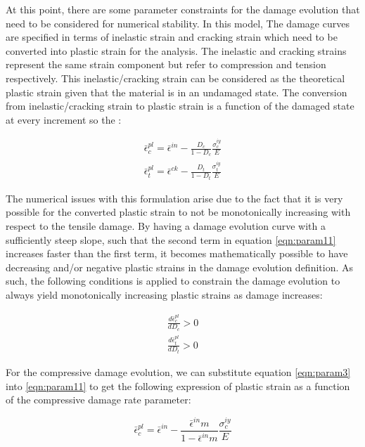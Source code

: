At this point, there are some parameter constraints for the damage evolution that need to be considered for numerical stability. In this model, The damage curves are specified in terms of inelastic strain and cracking strain which need to be converted into plastic strain for the analysis. The inelastic and cracking strains represent the same strain component but refer to compression and tension respectively. This inelastic/cracking strain can be considered as the theoretical plastic strain given that the material is in an undamaged state. The conversion from inelastic/cracking strain to plastic strain is a function of the damaged state at every increment so the :

\begin{equation}
\label{eqn:param11}
\begin{array}{c}
\bar{\epsilon}_{c}^{pl}=\bar{\epsilon}^{in}-\frac{D_{c}}{1-D_{c}}\frac{\sigma_{c}^{iy}}{E}\\
\bar{\epsilon}_{t}^{pl}=\bar{\epsilon}^{ck}-\frac{D_{t}}{1-D_{t}}\frac{\sigma_{t}^{iy}}{E}
\end{array}
\end{equation}


The numerical issues with this formulation arise due to the fact that it is very possible for the converted plastic strain to not be monotonically increasing with respect to the tensile damage. By having a damage evolution curve with a sufficiently steep slope, such that the second term in equation \ref{eqn:param11} increases faster than the first term, it becomes mathematically possible to have decreasing and/or negative plastic strains in the damage evolution definition. As such, the following conditions is applied to constrain the damage evolution to always yield monotonically increasing plastic strains as damage increases:

\begin{equation}
\label{eqn:param6-1}
\begin{array}{c}
\frac{d\bar{\epsilon}_{c}^{pl}}{dD_{c}}>0\\
\frac{d\bar{\epsilon}_{t}^{pl}}{dD_{t}}>0
\end{array}
\end{equation}


For the compressive damage evolution, we can substitute equation \ref{eqn:param3} into \ref{eqn:param11} to get the following expression of plastic strain as a function of the compressive damage rate parameter:

\begin{equation}
\bar{\epsilon}_{c}^{pl}=\bar{\epsilon}^{in}-\frac{\bar{\epsilon}^{in}m}{1-\bar{\epsilon}^{in}m}\frac{\sigma_{c}^{iy}}{E}\label{eqn:param12}
\end{equation}

